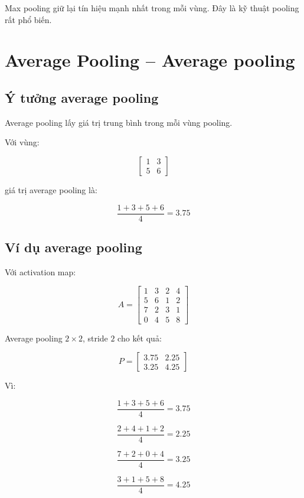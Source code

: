 \begin{ghinho}
Max pooling giữ lại tín hiệu mạnh nhất trong mỗi vùng. Đây là kỹ thuật pooling rất phổ biến.
\end{ghinho}

\section{Average Pooling -- Average pooling}

\subsection{Ý tưởng average pooling}

Average pooling lấy giá trị trung bình trong mỗi vùng pooling.

Với vùng:

\[
    \begin{bmatrix}
    1 & 3\\
    5 & 6
    \end{bmatrix}
\]

giá trị average pooling là:

\[
    \frac{1+3+5+6}{4}
    =
    3.75
\]

\subsection{Ví dụ average pooling}

Với activation map:

\[
    A =
    \begin{bmatrix}
    1 & 3 & 2 & 4\\
    5 & 6 & 1 & 2\\
    7 & 2 & 3 & 1\\
    0 & 4 & 5 & 8
    \end{bmatrix}
\]

Average pooling $2\times2$, stride $2$ cho kết quả:

\[
    P =
    \begin{bmatrix}
    3.75 & 2.25\\
    3.25 & 4.25
    \end{bmatrix}
\]

Vì:

\[
    \frac{1+3+5+6}{4}=3.75
\]

\[
    \frac{2+4+1+2}{4}=2.25
\]

\[
    \frac{7+2+0+4}{4}=3.25
\]

\[
    \frac{3+1+5+8}{4}=4.25
\]

